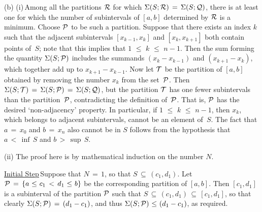         (b) (i)\,Among all the partitions ${\cal R}$ for which ${\Sigma}(S;{\cal R}) \,=\, {\Sigma}(S;{\cal Q})$,
    there is at least one for which the number of subintervals of $[a,b]$ determined by ${\cal R}$ is a minimum.
    Choose ${\cal P}$ to be such a partition. Suppose that there exists an index $k$ such that the adjacent subintervals $[x_{k-1},x_{k}]$ and $[x_{k},x_{k+1}]$ both contain points of~$S$;
    note that this implies that $1\,\,{\leq}\,\,k\,\,{\leq}\,\,n-1$. Then the sum forming the quantity ${\Sigma}(S;{\cal P})$ includes the summands $(x_{k}-x_{k-1})$ and $(x_{k+1}-x_{k})$,
    which together add up to $x_{k+1}-x_{k-1}$. Now let ${\cal T}$ be the partition of $[a,b]$ obtained by removing the number $x_{k}$ from the set~${\cal P}$.
    Then ${\Sigma}(S;{\cal T}) \,=\, {\Sigma}(S;{\cal P}) \,=\, {\Sigma}(S;{\cal Q})$, but the partition ${\cal T}$
    has one fewer subintervals than the partition~${\cal P}$, contradicting the definition of~${\cal P}$.
    That is, ${\cal P}$ has the desired `non-adjacency' property. In particular, if $1\,\,{\leq}\,\,k\,\,{\leq}\,\,n-1$, then $x_{k}$, which belongs to adjacent subintervals,
    cannot be an element of~$S$. The fact that $a \,=\, x_{0}$ and $b \,=\, x_{n}$ also cannot be in $S$ follows from the hypothesis that $a\,<\,{\inf}\,S$ and $b\,>\,{\sup}\,S$.

\VA

        (ii) The proof here is by mathematical induction on the number $N$.

        \underline{Initial Step}\,Suppose that $N \,=\, 1$, so that $S \,{\subseteq}\, (c_{1},d_{1})$. Let ${\cal P} \,=\,\{a\,\,{\leq}\,\,c_{1}\,<\,d_{1}\,\,{\leq}\,\,b\}$ be the corresponding partition of $[a,b]$.
    Then $[c_{1},d_{1}]$ is a subinterval of the partition ${\cal P}$ such that $S \,{\subseteq}\, (c_{1},d_{1}) \,{\subseteq}\, [c_{1},d_{1}]$,
    so that clearly ${\Sigma}(S;{\cal P}) \,=\, (d_{1}-c_{1})$, and thus ${\Sigma}(S;{\cal P})\,\,{\leq}\,\,(d_{1}-c_{1})$, as required.

